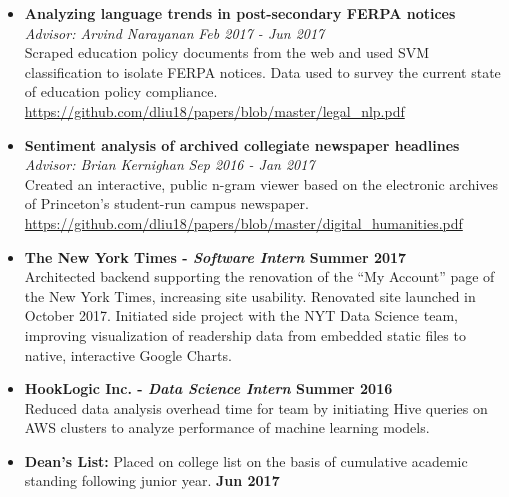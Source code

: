 \documentclass[margin]{res}
\begin{document}
\begin{resume}
\begin{itemize}
\item
{\bf Analyzing language trends in post-secondary FERPA notices} \\
\emph{Advisor: Arvind Narayanan} \emph{Feb 2017 - Jun 2017}\\
Scraped education policy documents from the web and used SVM classification to isolate FERPA notices. Data used to survey the current state of education policy compliance.\\
\url{https://github.com/dliu18/papers/blob/master/legal_nlp.pdf}\\

\item
{\bf Sentiment analysis of archived collegiate newspaper headlines}\\
\emph{Advisor: Brian Kernighan} \emph{Sep 2016 - Jan 2017}\\
Created an interactive, public n-gram viewer based on the electronic archives of Princeton's student-run campus newspaper. \\
\url{https://github.com/dliu18/papers/blob/master/digital_humanities.pdf}
\end{itemize}

\begin{itemize}
\section{Industry \\Internships}
\item
{\bf The New York Times - {\em{Software Intern}}  \hfill  Summer 2017}\\
Architected backend supporting the renovation of the “My Account” page of the New York Times, increasing site usability. Renovated site launched in October 2017. Initiated side project with the NYT Data Science team, improving visualization of readership data from embedded static files to native, interactive Google Charts.

\item
{\bf HookLogic Inc. - {\em{Data Science Intern}}  \hfill Summer 2016}\\
Reduced data analysis overhead time for team by initiating Hive queries on AWS clusters to analyze performance of machine learning models.
\end{itemize}


\begin{itemize}
\section{Awards  and Honors}
\item
{\bf {Dean's List:}} Placed on college list on the basis of cumulative academic standing following junior year.  {\bf \hfill Jun 2017}


\end{itemize}
\end{resume}
\end{document}
